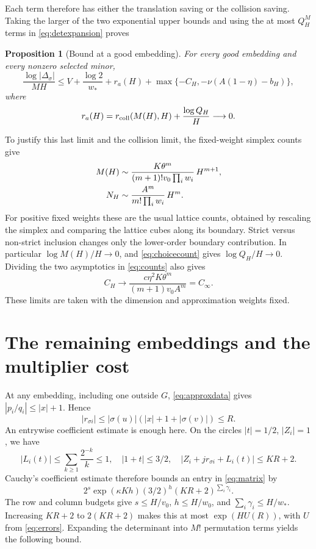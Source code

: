 \documentclass[11pt]{article}
\newtheorem{proposition}[theorem]{Proposition}
\theoremstyle{definition}
\theoremstyle{remark}
\theoremstyle{plain}
\begin{document}
Each term therefore has either the translation saving or the collision
saving. Taking the larger of the two exponential upper bounds and using
the at most \(Q_H^M\) terms in \eqref{eq:detexpansion} proves
\begin{proposition}[Bound at a good embedding]\label{prop:goodbound}
For every good embedding and every nonzero selected minor,
\begin{equation}\label{eq:goodbound}
 \frac{\log|\Delta_\sigma|}{MH}
 \le V+\frac{\log2}{w_*}+r_a(H)
       +\max\{-C_H,-\nu(A(1-\eta)-b_H)\},
\end{equation}
where
\[
 r_a(H)=r_{\rm coll}(M(H),H)+\frac{\log Q_H}{H}
 \longrightarrow0.
\]
\end{proposition}

To justify this last limit and the collision limit, the fixed-weight
simplex counts give
\begin{align}
 M(H)&\sim\frac{K\theta^m}{(m+1)!v_0\prod_iw_i}\,H^{m+1},
 \label{eq:counts}\\
 N_H&\sim\frac{A^m}{m!\prod_iw_i}\,H^m.\notag
\end{align}
For positive fixed weights these are the usual lattice counts, obtained
by rescaling the simplex and comparing the lattice cubes along its
boundary. Strict versus non-strict inclusion changes only the lower-order
boundary contribution. In particular \(\log M(H)/H\to0\), and
\eqref{eq:choicecount} gives \(\log Q_H/H\to0\). Dividing the two
asymptotics in \eqref{eq:counts} also gives
\begin{equation}\label{eq:ratelimit}
 C_H\longrightarrow
 \frac{c\eta^2K\theta^m}{(m+1)v_0A^m}=C_\infty.
\end{equation}
These limits are taken with the dimension and approximation weights fixed.

\section{The remaining embeddings and the multiplier cost}\label{sec:coarse}
At any embedding, including one outside \(G\),
\eqref{eq:approxdata} gives \(|p_i/q_i|\le|x|+1\). Hence
\begin{equation}\label{eq:coarsecenters}
 |r_{\sigma i}|\le|\sigma(u)|(|x|+1+|\sigma(v)|)\le R.
\end{equation}
An entrywise coefficient estimate is enough here. On the circles
\(|t|=1/2\), \(|Z_i|=1\), we have
\[
 |L_i(t)|\le\sum_{k\ge1}\frac{2^{-k}}k\le1,
 \quad |1+t|\le3/2,
 \quad |Z_i+jr_{\sigma i}+L_i(t)|\le KR+2.
\]
Cauchy's coefficient estimate therefore bounds an entry in
\eqref{eq:matrix} by
\[
 2^s\exp(\kappa Kh)(3/2)^h(KR+2)^{\sum_i\gamma_i}.
\]
The row and column budgets give \(s\le H/v_0\), \(h\le H/w_0\),
and \(\sum_i\gamma_i\le H/w_*\). Increasing \(KR+2\) to
\(2(KR+2)\) makes this at most \(\exp(HU(R))\), with \(U\) from
\eqref{eq:errors}. Expanding the determinant into \(M!\) permutation
terms yields the following bound.
\end{document}
